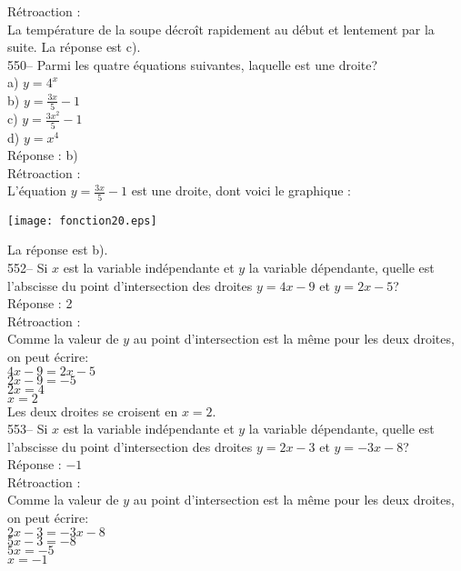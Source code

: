 ﻿\documentclass[letterpaper, 12pt]{article}
\begin{document}
R\'etroaction : \\
La temp\'erature de la soupe d\'ecro\^it rapidement au d\'ebut et lentement
par la suite.  La r\'eponse est c).\\

550-- Parmi les quatre \'equations suivantes, laquelle est une droite?\\
a) $y=4^{x}$\\[2mm]
b) $y=\frac{3x}{5}-1$\\[2mm]
c) $y=\frac{3x^{2}}{5}-1$\\[2mm]
d) $y=x^{4}$\\

R\'eponse : b)\\

R\'etroaction : \\
L'\'equation $y=\frac{3x}{5}-1$ est une droite, dont voici le
graphique : \\
    \begin{center}
    \texttt{[image: fonction20.eps]}
    \end{center}

La r\'eponse est b).\\


552-- Si $x$ est la variable ind\'ependante et $y$ la variable d\'ependante,
quelle est l'abscisse du point d'intersection des droites $y=4x-9$ et
$y=2x-5$?\\

R\'eponse : 2\\

R\'etroaction : \\
Comme la valeur de $y$ au point d'intersection est la m\^eme pour les deux
droites, on peut \'ecrire:\\
$4x-9=2x-5$\\
$2x-9=-5$\\
$2x=4$\\
$x=2$\\

Les deux droites se croisent en $x=2$.\\

553-- Si $x$ est la variable ind\'ependante et $y$ la variable d\'ependante,
quelle est l'abscisse du point d'intersection des droites $y=2x-3$ et
$y=-3x-8$?\\

R\'eponse : $-1$\\

R\'etroaction : \\
Comme la valeur de $y$ au point d'intersection est la m\^eme pour les deux
droites, on peut \'ecrire:\\
$2x-3=-3x-8$\\
$5x-3=-8$\\
$5x=-5$\\
$x=-1$\\
\end{document}
